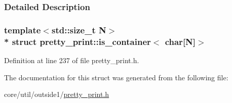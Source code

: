 \subsubsection{Detailed Description}
\subsubsection*{template$<$std\+::size\+\_\+t N$>$\\*
struct pretty\+\_\+print\+::is\+\_\+container$<$ char\mbox{[}\+N\mbox{]}$>$}



Definition at line 237 of file pretty\+\_\+print.\+h.



The documentation for this struct was generated from the following file\+:\begin{DoxyCompactItemize}
\item 
core/util/outside1/\hyperlink{pretty__print_8h}{pretty\+\_\+print.\+h}\end{DoxyCompactItemize}
